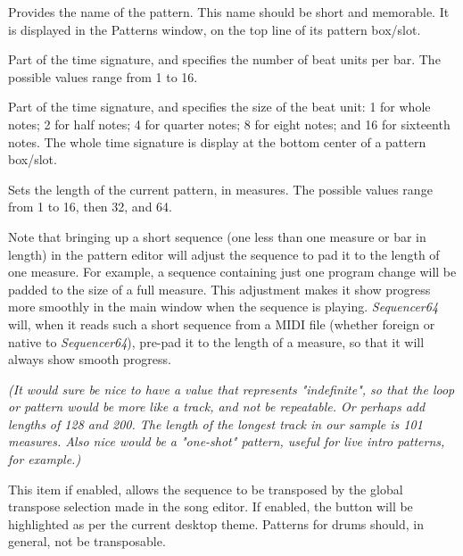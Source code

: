    \setcounter{ItemCounter}{0}      %

   Provides the name of the pattern.
   This name should be short and memorable.
   It is displayed in the Patterns window, on the top line of its pattern
   box/slot.

   Part of the time signature, and specifies the number of beat units per bar.
   The possible values range from 1 to 16.

   Part of the time signature, and specifies the size of the beat unit:
   1 for whole notes; 2 for half notes; 4 for quarter notes; 8 for eight notes;
   and 16 for sixteenth notes.
   The whole time signature is display at the bottom center of a pattern
   box/slot.

   Sets the length of the current pattern, in measures.
   The possible values range from 1 to 16, then 32, and 64.

   Note that bringing up a short sequence (one less than one measure or bar in
   length) in the pattern editor will adjust the sequence to pad it to the
   length of one measure.  For example, a sequence containing just one program
   change will be padded to the size of a full measure.
   This adjustment makes it show progress more smoothly in the main window when
   the sequence is playing.
   \textsl{Sequencer64} will, when it reads such a short sequence
   from a MIDI file (whether foreign or native to \textsl{Sequencer64}),
   pre-pad it to the length of a measure, so that it will always show smooth
   progress.

   \textsl{(It would sure be nice to have a value that represents
   "indefinite", so that the loop or pattern would be more like a track,
   and not be repeatable.  Or perhaps add lengths of 128 and 200.  The length
   of the longest track in our sample is 101 measures.
   Also nice would be a "one-shot"
   pattern, useful for live intro patterns, for example.)}

   This item if enabled, allows the sequence to be transposed by the global
   transpose selection made in the song editor.  If enabled, the button will be
   highlighted as per the current desktop theme.  Patterns for drums should,
   in general, not be transposable.

